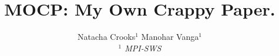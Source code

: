 

\newif \ifDraft\Drafttrue

\ifDraft
  \newcommand{\Comment}[1]{\textbf{\textsl{#1}}}
\else
  \newcommand{\Comment}[1]{\relax}
\fi

\newcommand{\gernot}[1]{\Comment{#1 [gernot]}}


\title{\textbf{
MOCP: My Own Crappy Paper. 
}}

\author{
Natacha Crooks$^1$ \quad
Manohar Vanga$^1$
\\ \emph{$^1$ MPI-SWS}
}
\date{\vspace{-8pt}}




\maketitle





%



\fontsize{8}{8.2}
\selectfont


\normalsize

